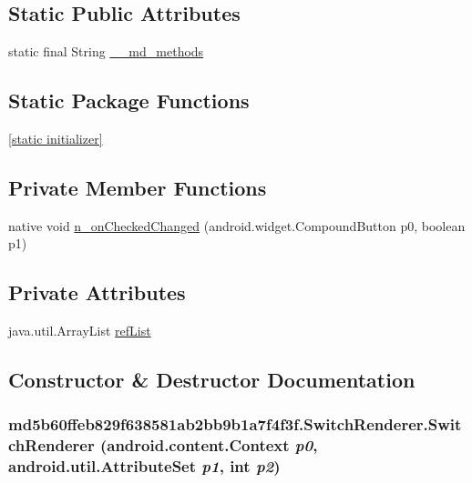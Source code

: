 \subsection*{Static Public Attributes}
\begin{CompactItemize}
\item 
static final String \hyperlink{classmd5b60ffeb829f638581ab2bb9b1a7f4f3f_1_1_switch_renderer_5d8d51148704e49b135709f942738f92}{\_\-\_\-md\_\-methods}
\end{CompactItemize}
\subsection*{Static Package Functions}
\begin{CompactItemize}
\item 
\hyperlink{classmd5b60ffeb829f638581ab2bb9b1a7f4f3f_1_1_switch_renderer_e710661b76463c9bcf3e5aa5ae37d860}{\mbox{[}static initializer\mbox{]}}
\end{CompactItemize}
\subsection*{Private Member Functions}
\begin{CompactItemize}
\item 
native void \hyperlink{classmd5b60ffeb829f638581ab2bb9b1a7f4f3f_1_1_switch_renderer_6d1599f163e2b3ba3d0c2223d62e8b34}{n\_\-onCheckedChanged} (android.widget.CompoundButton p0, boolean p1)
\end{CompactItemize}
\subsection*{Private Attributes}
\begin{CompactItemize}
\item 
java.util.ArrayList \hyperlink{classmd5b60ffeb829f638581ab2bb9b1a7f4f3f_1_1_switch_renderer_d6c93485d20d2c459c3ad2829f699a70}{refList}
\end{CompactItemize}


\subsection{Constructor \& Destructor Documentation}
\hypertarget{classmd5b60ffeb829f638581ab2bb9b1a7f4f3f_1_1_switch_renderer_832f5f93ae7ecd3f08aedc1037692738}{
\subsubsection[{SwitchRenderer}]{\setlength{\rightskip}{0pt plus 5cm}md5b60ffeb829f638581ab2bb9b1a7f4f3f.SwitchRenderer.SwitchRenderer (android.content.Context {\em p0}, \/  android.util.AttributeSet {\em p1}, \/  int {\em p2})}}
\label{classmd5b60ffeb829f638581ab2bb9b1a7f4f3f_1_1_switch_renderer_832f5f93ae7ecd3f08aedc1037692738}


